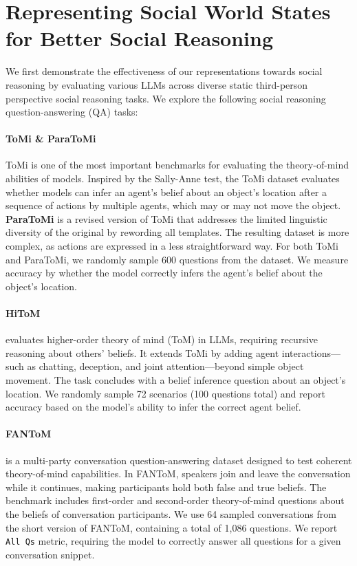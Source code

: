 \section{Representing Social World States for Better Social Reasoning}
\label{sec:social_understanding}
We first demonstrate the effectiveness of our \protocolname representations towards social reasoning by evaluating various LLMs across diverse static third-person perspective social reasoning tasks. We explore the following social reasoning question-answering (QA) tasks:


\paragraph{ToMi \& ParaToMi} 
ToMi \citep{Le2019RevisitingTE} is one of the most important benchmarks for evaluating the theory-of-mind abilities of models.
Inspired by the Sally-Anne test, the ToMi dataset evaluates whether models can infer an agent's belief about an object's location after a sequence of actions by multiple agents, which may or may not move the object. 
\textbf{ParaToMi}  is a revised version of ToMi \citep{Le2019RevisitingTE} that addresses the limited linguistic diversity of the original by rewording all templates. The resulting dataset is more complex, as actions are expressed in a less straightforward way. 
For both ToMi and ParaToMi, we randomly sample 600 questions from the dataset.
We measure accuracy by whether the model correctly infers the agent's belief about the object's location.

\paragraph{HiToM} \citep{wu-etal-2023-hi} evaluates higher-order theory of mind (ToM) in LLMs, requiring recursive reasoning about others’ beliefs. It extends ToMi by adding agent interactions—such as chatting, deception, and joint attention—beyond simple object movement. The task concludes with a belief inference question about an object’s location. We randomly sample 72 scenarios (100 questions total) and report accuracy based on the model’s ability to infer the correct agent belief.

\paragraph{FANToM}  is a multi-party conversation question-answering dataset designed to test coherent theory-of-mind capabilities. 
In FANToM, speakers join and leave the conversation while it continues, making participants hold both false and true beliefs. The benchmark includes first-order and second-order theory-of-mind questions about the beliefs of conversation participants. We use 64 sampled conversations from the short version of FANToM, containing a total of 1,086 questions. We report \texttt{All Qs} metric, requiring the model to correctly answer all questions for a given conversation snippet.

